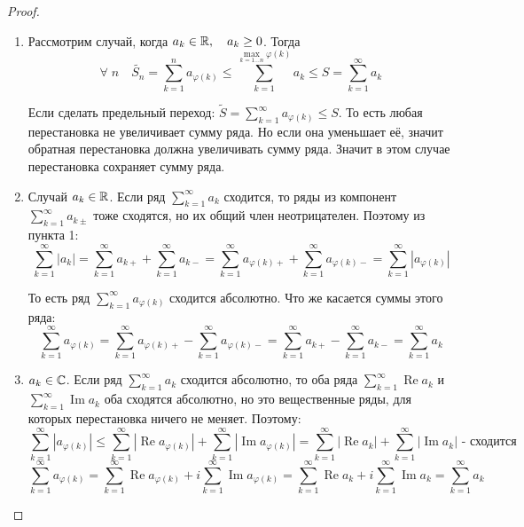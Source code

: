 \documentclass[../main.tex]{subfiles}
\begin{document}
\begin{proof}
    
    ~

    \begin{enumerate}
        \item Рассмотрим случай, когда \( a_k \in \mathbb{R} ,\quad a_k \geq 0 \). Тогда
        \[ \forall \; n\quad \tilde{ S_n}= \sum\limits_{ k=1}^{ n} a_{ \varphi \left( k\right)} \leq \sum\limits_{ k=1}^{ \max\limits_{ k=1 \ldots n} \varphi \left( k\right)} a_k \leq S= \sum\limits_{ k=1}^{ \infty } a_k\]
        \par Если сделать предельный переход: \( \tilde{ S}= \sum\limits_{ k=1}^{ \infty } a_{ \varphi \left( k\right)} \leq S\). То есть любая перестановка не увеличивает сумму ряда. Но если она уменьшает её, значит обратная перестановка должна увеличивать сумму ряда. Значит в этом случае перестановка сохраняет сумму ряда. 
        \item Случай \( a_k \in \mathbb{R} \). Если ряд \( \sum\limits_{ k=1}^{ \infty } a_k\) сходится, то ряды из компонент \( \sum\limits_{ k=1}^{ \infty } a_{k\pm}\) тоже сходятся, но их общий член неотрицателен. Поэтому из пункта 1:
        \[ \sum\limits_{ k=1}^{ \infty } \left| a_k\right|= \sum\limits_{ k=1}^{ \infty } a_{k+}+ \sum\limits_{ k=1}^{ \infty } a_{k-}= \sum\limits_{ k=1}^{ \infty } a_{ \varphi \left( k\right)+}+ \sum\limits_{ k=1}^{ \infty } a_{ \varphi \left( k\right)-}= \sum\limits_{ k=1}^{ \infty } \left| a_{ \varphi \left( k\right)}\right|\]
        \par То есть ряд \( \sum\limits_{ k=1}^{ \infty } a_{ \varphi \left( k\right)}\) сходится абсолютно. Что же касается суммы этого ряда:
        \[ \sum\limits_{ k=1}^{ \infty } a_{ \varphi \left( k\right)}= \sum\limits_{ k=1}^{ \infty } a_{ \varphi \left( k\right)+}- \sum\limits_{ k=1}^{ \infty } a_{ \varphi \left( k\right)-}= \sum\limits_{ k=1}^{ \infty } a_{k+}- \sum\limits_{ k=1}^{ \infty } a_{k-}= \sum\limits_{ k=1}^{ \infty} a_k\]
        \item \(a_k \in \mathbb{C}\). Если ряд \( \sum\limits_{ k=1}^{ \infty } a_k\) сходится абсолютно, то оба ряда \( \sum\limits_{ k=1}^{ \infty } \operatorname{Re}a_k\) и \( \sum\limits_{ k=1}^{ \infty } \operatorname{Im}a_k\) оба сходятся абсолютно, но это вещественные ряды, для которых перестановка ничего не меняет. Поэтому:
        \[ \sum\limits_{ k=1}^{ \infty } \left| a_{ \varphi \left( k\right)}\right| \leq \sum\limits_{ k=1}^{ \infty } \left| \operatorname{Re}a_{ \varphi \left( k\right)}\right|+ \sum\limits_{ k=1}^{ \infty } \left| \operatorname{Im}a_{ \varphi \left( k\right)}\right|= \sum\limits_{ k=1}^{ \infty } \left| \operatorname{Re}a_k\right|+ \sum\limits_{ k=1}^{ \infty } \left| \operatorname{Im}a_k\right| \textrm{ - сходится}\]
        \[ \sum\limits_{ k=1}^{ \infty } a_{ \varphi \left( k\right)}= \sum\limits_{ k=1}^{ \infty } \operatorname{Re}a_{ \varphi \left( k\right)}+ i \sum\limits_{ k=1}^{ \infty } \operatorname{Im}a_{ \varphi \left( k\right)}= \sum\limits_{ k=1}^{ \infty } \operatorname{Re}a_k+i \sum\limits_{ k=1}^{ \infty } \operatorname{Im}a_k= \sum\limits_{ k=1}^{ \infty } a_k\]
    \end{enumerate}
\end{proof}
\end{document}
